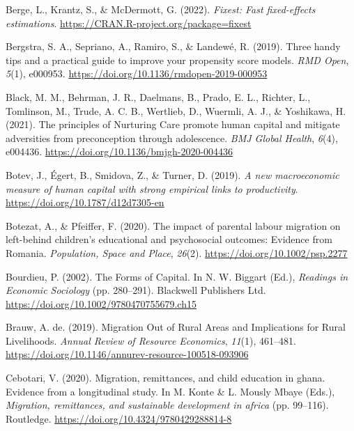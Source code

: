 \documentclass[
  man,floatsintext]{apa7}
\newlength{\cslhangindent}
\newlength{\cslentryspacingunit} %
\newenvironment{CSLReferences}[2] %
 {%
  \setlength{\parindent}{0pt}
  \ifodd #1
  \let\oldpar\par
  \def\par{\hangindent=\cslhangindent\oldpar}
  \fi
  \setlength{\parskip}{#2\cslentryspacingunit}
 }%
 {}
\begin{document}
\begin{CSLReferences}{1}{0}
\leavevmode{}%
Berge, L., Krantz, S., \& McDermott, G. (2022). \emph{Fixest: Fast fixed-effects estimations}. \url{https://CRAN.R-project.org/package=fixest}

\leavevmode{}%
Bergstra, S. A., Sepriano, A., Ramiro, S., \& Landewé, R. (2019). Three handy tips and a practical guide to improve your propensity score models. \emph{RMD Open}, \emph{5}(1), e000953. \url{https://doi.org/10.1136/rmdopen-2019-000953}

\leavevmode{}%
Black, M. M., Behrman, J. R., Daelmans, B., Prado, E. L., Richter, L., Tomlinson, M., Trude, A. C. B., Wertlieb, D., Wuermli, A. J., \& Yoshikawa, H. (2021). The principles of Nurturing Care promote human capital and mitigate adversities from preconception through adolescence. \emph{BMJ Global Health}, \emph{6}(4), e004436. \url{https://doi.org/10.1136/bmjgh-2020-004436}

\leavevmode{}%
Botev, J., Égert, B., Smidova, Z., \& Turner, D. (2019). \emph{A new macroeconomic measure of human capital with strong empirical links to productivity}. \url{https://doi.org/10.1787/d12d7305-en}

\leavevmode{}%
Botezat, A., \& Pfeiffer, F. (2020). The impact of parental labour migration on left{-}behind children's educational and psychosocial outcomes: Evidence from Romania. \emph{Population, Space and Place}, \emph{26}(2). \url{https://doi.org/10.1002/psp.2277}

\leavevmode{}%
Bourdieu, P. (2002). The Forms of Capital. In N. W. Biggart (Ed.), \emph{Readings in Economic Sociology} (pp. 280--291). Blackwell Publishers Ltd. \url{https://doi.org/10.1002/9780470755679.ch15}

\leavevmode{}%
Brauw, A. de. (2019). Migration Out of Rural Areas and Implications for Rural Livelihoods. \emph{Annual Review of Resource Economics}, \emph{11}(1), 461--481. \url{https://doi.org/10.1146/annurev-resource-100518-093906}

\leavevmode{}%
Cebotari, V. (2020). Migration, remittances, and child education in ghana. Evidence from a longitudinal study. In M. Konte \& L. Mously Mbaye (Eds.), \emph{Migration, remittances, and sustainable development in africa} (pp. 99--116). Routledge. \url{https://doi.org/10.4324/9780429288814-8}


\end{CSLReferences}
\end{document}

